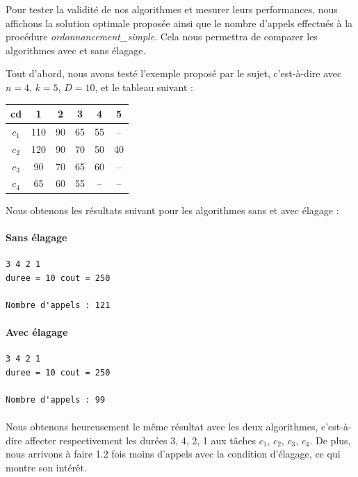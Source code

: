 \documentclass[a4paper, titlepage]{article}
\begin{document}
	Pour tester la validité de nos algorithmes et mesurer leurs performances, nous affichons la solution optimale proposée ainsi que le nombre d'appels effectués à la procédure \emph{ordonnancement\_simple}.
	Cela nous permettra de comparer les algorithmes avec et sans élagage.

	Tout d'abord, nous avons testé l'exemple proposé par le sujet, c'est-à-dire avec $n=4$, $k=5$, $D=10$, et le tableau suivant :

	\begin{center}
		\begin{tabular}{|c|c|c|c|c|c|}
			\hline
			cd	& 1	& 2	& 3	& 4	& 5 \\ \hline
			$c_1$	& 110	& 90	& 65	& 55	& -- \\ \hline
			$c_2$	& 120	& 90	& 70	& 50	& 40 \\ \hline
			$c_3$	& 90	& 70	& 65	& 60	& -- \\ \hline
			$c_4$	& 65	& 60	& 55	& --	& -- \\
			\hline
		\end{tabular}
	\end{center}

	Nous obtenons les résultats suivant pour les algorithmes sans et avec élagage :

\begin{framed}
\paragraph{Sans élagage\\}
\begin{verbatim}
3 4 2 1
duree = 10 cout = 250

Nombre d'appels : 121
\end{verbatim}
\end{framed}

\begin{framed}
\paragraph{Avec élagage\\}
\begin{verbatim}
3 4 2 1
duree = 10 cout = 250

Nombre d'appels : 99
\end{verbatim}
\end{framed}

	\paragraph{}
	Nous obtenons heureusement le même résultat avec les deux algorithmes, c'est-à-dire affecter respectivement les durées 3, 4, 2, 1 aux tâches $c_1$, $c_2$, $c_3$, $c_4$.
	De plus, nous arrivons à faire 1.2 fois moins d'appels avec la condition d'élagage, ce qui montre son intérêt.
\end{document}
